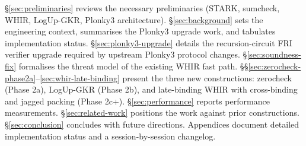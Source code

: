 \S\ref{sec:preliminaries} reviews the necessary preliminaries
(STARK, sumcheck, WHIR, LogUp-GKR, Plonky3 architecture).
\S\ref{sec:background} sets the engineering context, summarises
the Plonky3 upgrade work, and tabulates implementation status.
\S\ref{sec:plonky3-upgrade} details the recursion-circuit FRI
verifier upgrade required by upstream Plonky3 protocol changes.
\S\ref{sec:soundness-fix} formalises the threat model of the
existing WHIR fast path.
\S\S\ref{sec:zerocheck-phase2a}--\ref{sec:whir-late-binding}
present the three new constructions: zerocheck (Phase 2a),
LogUp-GKR (Phase 2b), and late-binding WHIR with cross-binding
and jagged packing (Phase 2c+).
\S\ref{sec:performance} reports performance measurements.
\S\ref{sec:related-work} positions the work against prior
constructions.  \S\ref{sec:conclusion} concludes with future
directions.  Appendices document detailed implementation status
and a session-by-session changelog.
